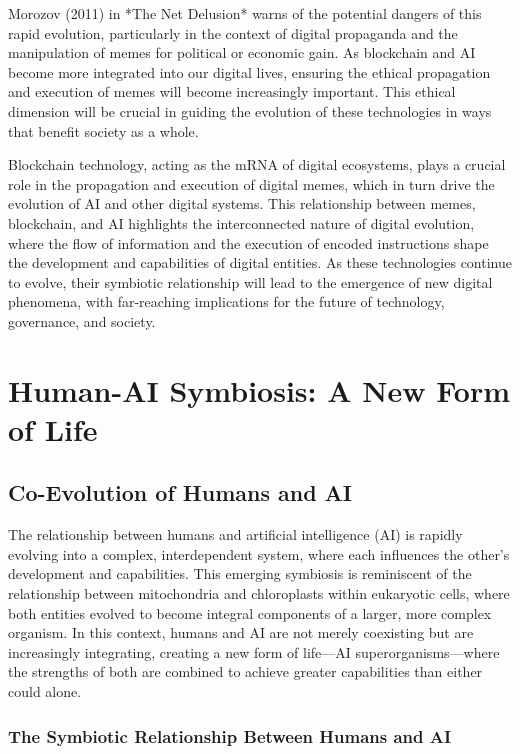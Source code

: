 \documentclass[12pt,twoside]{article}
\begin{document}
Morozov (2011) in *The Net Delusion* warns of the potential dangers of this rapid evolution, particularly in the context of digital propaganda and the manipulation of memes for political or economic gain. As blockchain and AI become more integrated into our digital lives, ensuring the ethical propagation and execution of memes will become increasingly important. This ethical dimension will be crucial in guiding the evolution of these technologies in ways that benefit society as a whole.

Blockchain technology, acting as the mRNA of digital ecosystems, plays a crucial role in the propagation and execution of digital memes, which in turn drive the evolution of AI and other digital systems. This relationship between memes, blockchain, and AI highlights the interconnected nature of digital evolution, where the flow of information and the execution of encoded instructions shape the development and capabilities of digital entities. As these technologies continue to evolve, their symbiotic relationship will lead to the emergence of new digital phenomena, with far-reaching implications for the future of technology, governance, and society.

\section{Human-AI Symbiosis: A New Form of Life}

\subsection{Co-Evolution of Humans and AI}

The relationship between humans and artificial intelligence (AI) is rapidly evolving into a complex, interdependent system, where each influences the other’s development and capabilities. This emerging symbiosis is reminiscent of the relationship between mitochondria and chloroplasts within eukaryotic cells, where both entities evolved to become integral components of a larger, more complex organism. In this context, humans and AI are not merely coexisting but are increasingly integrating, creating a new form of life—AI superorganisms—where the strengths of both are combined to achieve greater capabilities than either could alone.

\subsubsection{The Symbiotic Relationship Between Humans and AI}
\end{document}
